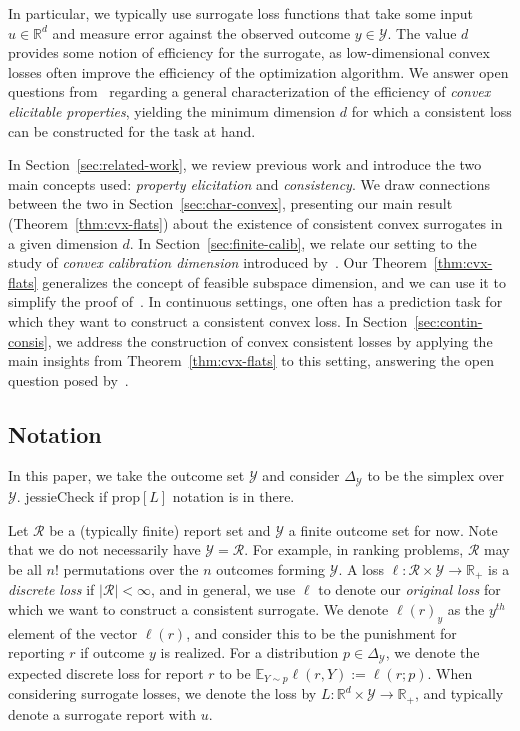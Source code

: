 \documentclass{article}
\newcommand{\Comments}{1}
\newcommand{\mynote}[2]{\ifnum\Comments=1\textcolor{#1}{#2}\fi}
\newcommand{\jessie}[1]{\mynote{purple}{[JF: #1]}}
\newcommand{\reals}{\mathbb{R}}
\newcommand{\simplex}{\Delta_\Y}
\newcommand{\prop}[1]{\mathrm{prop}[#1]}
\newcommand{\E}{\mathbb{E}}
\newcommand{\R}{\mathcal{R}}
\newcommand{\Y}{\mathcal{Y}}
\begin{document}
In particular, we typically use surrogate loss functions that take some input $u \in \reals^d$ and measure error against the observed outcome $y \in \Y$.
The value $d$ provides some notion of efficiency for the surrogate, as low-dimensional convex losses often improve the efficiency of the optimization algorithm.
We answer open questions from~\cite{frongillo2015elicitation} regarding a general characterization of the efficiency of \emph{convex elicitable properties}, yielding the minimum dimension $d$ for which a consistent loss can be constructed for the task at hand.

In Section~\ref{sec:related-work}, we review previous work and introduce the two main concepts used: \emph{property elicitation} and \emph{consistency}.
We draw connections between the two in Section~\ref{sec:char-convex}, presenting our main result (Theorem~\ref{thm:cvx-flats}) about the existence of consistent convex surrogates in a given dimension $d$.
In Section~\ref{sec:finite-calib}, we relate our setting to the study of \emph{convex calibration dimension} introduced by~\cite{ramaswamy2016convex}.
Our Theorem~\ref{thm:cvx-flats} generalizes the concept of feasible subspace dimension, and we can use it to simplify the proof of~\cite[Theorem \jessie{CHECK}]{ramaswamy2016convex}.
In continuous settings, one often has a prediction task for which they want to construct a consistent convex loss.
In Section~\ref{sec:contin-consis}, we address the construction of convex consistent losses by applying the main insights from Theorem~\ref{thm:cvx-flats} to this setting, answering the open question posed by~\cite[Ref?]{frongillo2015elicitation}.


\subsection{Notation}
In this paper, we take the outcome set $\Y$ and consider $\simplex$ to be the simplex over $\Y$. 
jessie{Check if $\prop{L}$ notation is in there.}

Let $\R$ be a (typically finite) report set and $\Y$ a finite outcome set for now.
Note that we do not necessarily have $\Y = \R$.  
For example, in ranking problems, $\R$ may be all $n!$ permutations over the $n$ outcomes forming $\Y$.
A loss $\ell : \R \times \Y \to \reals_+$ is a \emph{discrete loss} if $|\R| < \infty$, and in general, we use $\ell$ to denote our \emph{original loss} for which we want to construct a consistent surrogate.
We denote $\ell(r)_y$ as the $y^{th}$ element of the vector $\ell(r)$, and consider this to be the punishment for reporting $r$ if outcome $y$ is realized.
For a distribution $p \in \simplex$, we denote the expected discrete loss for report $r$ to be $\E_{Y \sim p} \ell(r, Y) := \ell(r; p)$.
When considering surrogate losses, we denote the loss by $L : \reals^d \times \Y \to \reals_+$, and typically denote a surrogate report with $u$.
\end{document}
